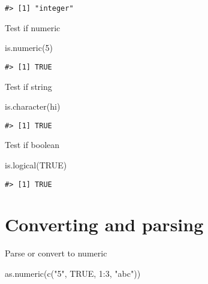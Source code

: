 \documentclass[
]{book}
\newenvironment{Shaded}{\begin{snugshade}}{\end{snugshade}}
\newcommand{\ConstantTok}[1]{\textcolor[rgb]{0.00,0.00,0.00}{#1}}
\newcommand{\DecValTok}[1]{\textcolor[rgb]{0.00,0.00,0.81}{#1}}
\newcommand{\FunctionTok}[1]{\textcolor[rgb]{0.00,0.00,0.00}{#1}}
\newcommand{\NormalTok}[1]{#1}
\newcommand{\SpecialCharTok}[1]{\textcolor[rgb]{0.00,0.00,0.00}{#1}}
\newcommand{\StringTok}[1]{\textcolor[rgb]{0.31,0.60,0.02}{#1}}
\begin{document}
\begin{verbatim}
#> [1] "integer"
\end{verbatim}

Test if numeric

\begin{Shaded}
\begin{Highlighting}[]
\FunctionTok{is.numeric}\NormalTok{(}\DecValTok{5}\NormalTok{)}
\end{Highlighting}
\end{Shaded}

\begin{verbatim}
#> [1] TRUE
\end{verbatim}

Test if string

\begin{Shaded}
\begin{Highlighting}[]
\FunctionTok{is.character}\NormalTok{(}\StringTok{\textquotesingle{}hi\textquotesingle{}}\NormalTok{)}
\end{Highlighting}
\end{Shaded}

\begin{verbatim}
#> [1] TRUE
\end{verbatim}

Test if boolean

\begin{Shaded}
\begin{Highlighting}[]
\FunctionTok{is.logical}\NormalTok{(}\ConstantTok{TRUE}\NormalTok{)}
\end{Highlighting}
\end{Shaded}

\begin{verbatim}
#> [1] TRUE
\end{verbatim}

\hypertarget{converting-and-parsing}{%
\section{Converting and parsing}\label{converting-and-parsing}}

Parse or convert to numeric

\begin{Shaded}
\begin{Highlighting}[]
\FunctionTok{as.numeric}\NormalTok{(}\FunctionTok{c}\NormalTok{(}\StringTok{"5"}\NormalTok{, }\ConstantTok{TRUE}\NormalTok{, }\DecValTok{1}\SpecialCharTok{:}\DecValTok{3}\NormalTok{, }\StringTok{"abc"}\NormalTok{))}
\end{Highlighting}
\end{Shaded}
\end{document}
